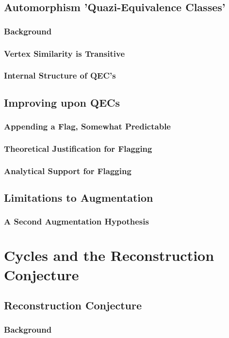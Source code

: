 \documentclass[11pt,a4paper]{report}
\begin{document}
\section{Automorphism 'Quazi-Equivalence Classes'}
\subsection{Background}
\subsection{Vertex Similarity is Transitive}
\subsection{Internal Structure of QEC's}

\section{Improving upon QECs}
\subsection{Appending a Flag, Somewhat Predictable}
\subsection{Theoretical Justification for Flagging}
\subsection{Analytical Support for Flagging}

\section{Limitations to Augmentation}
\subsection{A Second Augmentation Hypothesis}


\chapter{Cycles and the Reconstruction Conjecture}

\section{Reconstruction Conjecture}
\subsection{Background}
\end{document}
